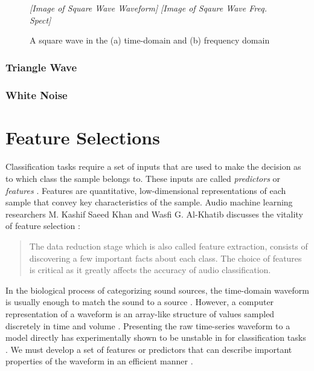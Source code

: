 \documentclass[12pt,letterpaper]{article}
\begin{document}
\begin{figure}[h]
\begin{center}
	\textit{[Image of Square Wave Waveform]}
	\textit{[Image of Sqaure Wave Freq. Spect]}
\end{center}
\caption{A square wave in the (a) time-domain and (b) frequency domain}
\label{fig-SquareWave}
\end{figure}


\subsubsection{Triangle Wave}


\subsubsection{White Noise}



\newpage
\section{Feature Selections}
\label{sec-Features}

\paragraph*{}Classification tasks require a set of inputs that are used to make the decision as to which class the sample belongs to. These inputs are called \textit{predictors} or \textit{features} \cite{James,Loy,Serizel}. Features are quantitative, low-dimensional representations of each sample that convey key characteristics of the sample. 
Audio machine learning researchers M. Kashif Saeed Khan and Wasfi G. Al-Khatib discusses the vitality of feature selection \cite{Khan}:
\begin{quote}
The data reduction stage which is also called feature extraction, consists of discovering a few important facts about each class. The choice of features is critical as it greatly affects the accuracy of audio classification. 
\end{quote}
In the biological process of categorizing sound sources, the time-domain waveform is usually enough to match the sound to a source \cite{Olson}. However, a computer representation of a waveform is an array-like structure of values sampled discretely in time and volume \cite{Virtanen,Liu}. Presenting the raw time-series waveform to a model directly has experimentally shown to be unstable in for classification tasks \cite{Serizel}. We must develop a set of features or predictors that can describe important properties of the waveform in an efficient manner \cite{Goodfellow,James}.
\end{document}
